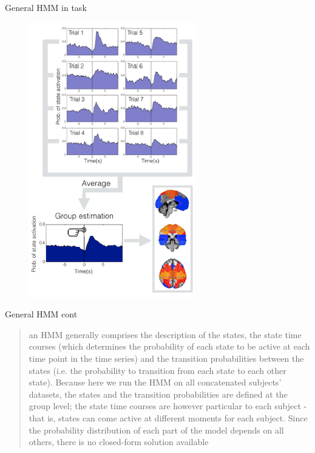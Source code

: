\documentclass{beamer}
\begin{document}
\begin{frame}{General HMM in task}
	\begin{figure}[h]
		\centering
			\includegraphics[scale=0.6]{../Figures/fig_vidaurre_1b.png}
	\end{figure}
\end{frame}

\begin{frame}{General HMM cont }
\begin{quote}
	an HMM
	generally comprises the description of the states, the state time courses
	(which determines the probability of each state to be active at each time
	point in the time series) and the transition probabilities between the
	states (i.e. the probability to transition from each state to each other
	state). Because here we run the HMM on all concatenated subjects'
	datasets, the states and the transition probabilities are defined at the
	group level; the state time courses are however particular to each subject
	- that is, states can come active at different moments for each subject.
	Since the probability distribution of each part of the model depends on all
	others, there is no closed-form solution available
\end{quote}
\end{frame}
	
	
\end{document}
